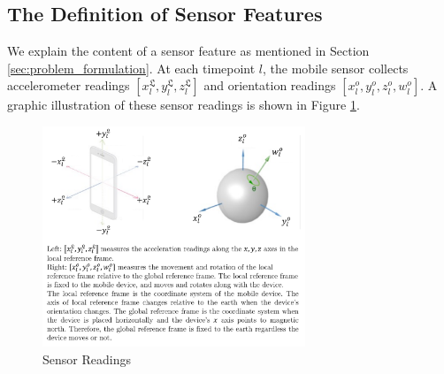 \documentclass[mnsc]{informs3b} %
\begin{document}
\begin{appendices}



\section{The Definition of Sensor Features}\label{apd:sen_features}

We explain the content of a sensor feature as mentioned in Section \ref{sec:problem_formulation}.
At each timepoint $l$, the mobile sensor collects accelerometer readings $[x_l^{\mathfrak{L}},y_l^{\mathfrak{L}},z_l^{\mathfrak{L}}]$ and orientation readings $[x_l^{o},y_l^{o},z_l^{o},w_l^{o}]$. A graphic illustration of these sensor readings is shown in Figure \ref{fig:frame_change}.
\begin{figure}[h]
    \centering
    \includegraphics[width=0.7\textwidth]{imgs/frame_change.pdf}
    \caption{Sensor Readings  }
    \label{fig:frame_change}
\end{figure}


\end{appendices}
\end{document}
